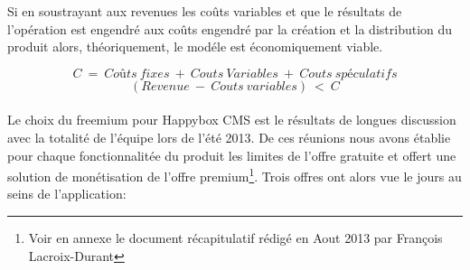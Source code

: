 \documentclass[11pt, a4paper ]{article}
\begin{document}
Si en soustrayant aux revenues les coûts variables et que le résultats de l'opération est engendré aux coûts engendré par la création et la distribution du produit alors, théoriquement, le modéle est économiquement viable.

\begin{equation}
	C\ =\ Coûts\ fixes\ +\ Couts\ Variables\ +\ Couts\ spéculatifs
\end{equation}
\begin{equation}
	(Revenue\ -\ Couts\ variables)\ <\ C
\end{equation}

\paragraph{} %
Le choix du freemium pour Happybox CMS est le résultats de longues discussion avec la totalité de l'équipe lors de l'été 2013. De ces réunions nous avons établie pour chaque fonctionnalitée du produit les limites de l'offre gratuite et offert une solution de monétisation de l'offre premium\footnote{Voir en annexe le document récapitulatif rédigé en Aout 2013 par François Lacroix-Durant}.
Trois offres ont alors vue le jours au seins de l'application:
\end{document}
